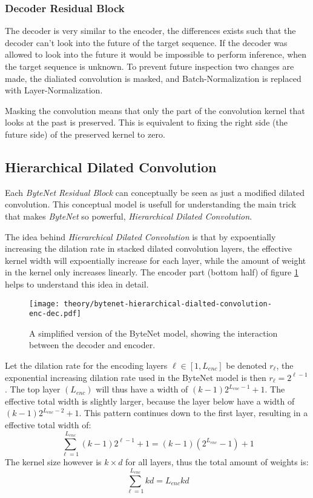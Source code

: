 \subsubsection{Decoder Residual Block}

The decoder is very similar to the encoder, the differences exists such that the decoder can't look into the future of the target sequence. If the decoder was allowed to look into the future it would be impossible to perform inference, when the target sequence is unknown. To prevent future inspection two changes are made‚ the dialiated convolution is masked, and Batch-Normalization is replaced with Layer-Normalization.

Masking the convolution means that only the part of the convolution kernel that looks at the past is preserved. This is equivalent to fixing the right side (the future side) of the preserved kernel to zero.

\subsection{Hierarchical Dilated Convolution}

Each \textit{ByteNet Residual Block} can conceptually be seen as just a modified dilated convolution. This conceptual model is usefull for understanding the main trick that makes \textit{ByteNet} so powerful, \textit{Hierarchical Dilated Convolution}.

The idea behind \textit{Hierarchical Dilated Convolution} is that by expoentially increasing the dilation rate in stacked dilated convolution layers, the effective kernel width will expoentially increase for each layer, while the amount of weight in the kernel only increases linearly. The encoder part (bottom half) of figure \ref{fig:bytenet:simplified-hdc} helps to understand this idea in detail.

\begin{figure}[h]
    \centering
    \texttt{[image: theory/bytenet-hierarchical-dialted-convolution-enc-dec.pdf]}
    \caption{A simplified version of the ByteNet model, showing the interaction between the decoder and encoder.}
    \label{fig:bytenet:simplified-hdc}
\end{figure}

Let the dilation rate for the encoding layers $\ell \in [1, L_{enc}]$ be denoted $r_\ell$, the exponential increasing dilation rate used in the ByteNet model is then $r_\ell = 2^{\ell - 1}$. The top layer $(L_{enc})$ will thus have a width of $(k-1) 2^{L_{enc} -1} + 1$. The effective total width is slightly larger, because the layer below have a width of $(k-1) 2^{L_{enc} - 2} + 1$. This pattern continues down to the first layer, resulting in a effective total width of:
\begin{equation}
\sum_{\ell = 1}^{L_{enc}} (k - 1) 2^{\ell-1} + 1 = (k - 1) (2^{L_{enc}} - 1) + 1
\end{equation}
The kernel size however is $k \times d$ for all layers, thus the total amount of weights is:
\begin{equation}
\sum_{\ell = 1}^{L_{enc}} k d = L_{enc} k d
\end{equation}

